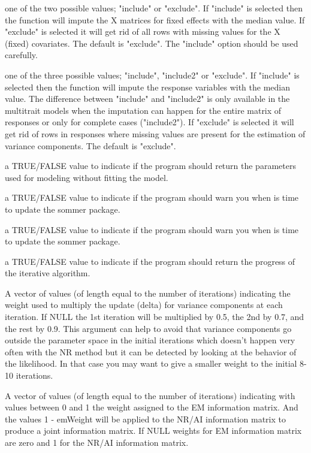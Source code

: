 \documentclass[a4paper]{book}
\begin{document}
\begin{Arguments}
\begin{ldescription}
\item[\code{naMethodX}] one of the two possible values; "include" or "exclude". If "include" is selected then the function will impute the X matrices for fixed effects with the median value. If "exclude" is selected it will get rid of all rows with missing values for the X (fixed) covariates. The default is "exclude". The "include" option should be used carefully.
\item[\code{naMethodY}] one of the three possible values; "include", "include2" or "exclude". If "include" is selected then the function will impute the response variables with the median value. The difference between "include" and "include2" is only available in the multitrait models when the imputation can happen for the entire matrix of responses or only for complete cases ("include2"). If "exclude" is selected it will get rid of rows in responses where missing values are present for the estimation of variance components. The default is "exclude".
\item[\code{returnParam}] a TRUE/FALSE value to indicate if the program should return the parameters used for modeling without fitting the model.
\item[\code{dateWarning}] a TRUE/FALSE value to indicate if the program should warn you when is time to update the sommer package.
\item[\code{date.warning}] a TRUE/FALSE value to indicate if the program should warn you when is time to update the sommer package.
\item[\code{verbose}] a TRUE/FALSE value to indicate if the program should return the progress of the iterative algorithm.
\item[\code{stepWeight}] A vector of values (of length equal to the number of iterations) indicating the weight used to multiply the update (delta) for variance components at each iteration. If NULL the 1st iteration will be multiplied by 0.5, the 2nd by 0.7, and the rest by 0.9. This argument can help to avoid that variance components go outside the parameter space in the initial iterations which doesn't happen very often with the NR method but it can be detected by looking at the behavior of the likelihood. In that case you may want to give a smaller weight to the initial 8-10 iterations.
\item[\code{emWeight}] A vector of values (of length equal to the number of iterations) indicating with values between 0 and 1 the weight assigned to the EM information matrix. And the values 1 - emWeight will be applied to the NR/AI information matrix to produce a joint information matrix. If NULL weights for EM information matrix are zero and 1 for the NR/AI information matrix.

\end{ldescription}
\end{Arguments}
\end{document}
